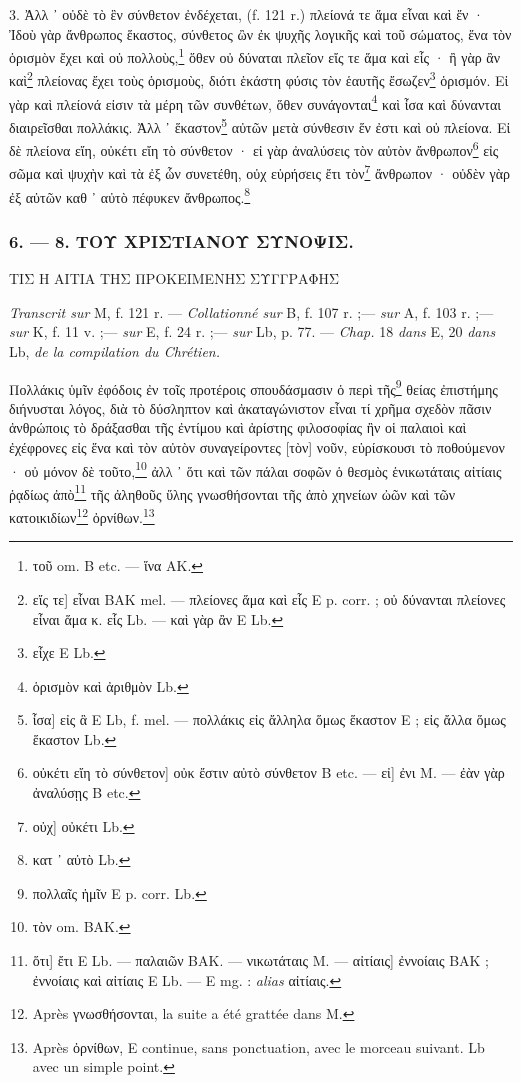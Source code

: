 \documentclass[a4paper, 11pt, oneside, polutonikogreek, french]{article}
\begin{document}
3. Ἀλλ ᾽ οὐδὲ τὸ ἓν σύνθετον ἐνδέχεται, (f. 121 r.) πλείονά τε ἅμα εἶναι καὶ ἕν · Ἰδοὺ γὰρ ἄνθρωπος ἕκαστος, σύνθετος ὢν ἐκ ψυχῆς λογικῆς καὶ τοῦ σώματος, ἕνα τὸν ὁρισμὸν ἔχει καὶ οὐ πολλοὺς,\footnote{τοῦ om. B etc. --- ἵνα AK.} ὅθεν οὐ δύναται πλεῖον εἴς τε ἅμα καὶ εἷς · ἢ γὰρ ἂν καὶ\footnote{εἴς τε] εἶναι BAK mel. --- πλείονες ἅμα καὶ εἷς E p. corr. ; οὐ δύνανται πλείονες εἶναι ἅμα κ. εἷς Lb. --- καὶ γὰρ ἂν E Lb.} πλείονας ἔχει τοὺς ὁρισμοὺς, διότι ἑκάστη φύσις τὸν ἑαυτῆς ἔσωζεν\footnote{εἶχε E Lb.} ὁρισμόν. Εἰ γὰρ καὶ πλείονά εἰσιν τὰ μέρη τῶν συνθέτων, ὅθεν συνάγονται\footnote{ὁρισμὸν καὶ ἀριθμὸν Lb.} καὶ ἶσα καὶ δύνανται διαιρεῖσθαι πολλάκις. Ἀλλ ᾽ ἕκαστον\footnote{ἶσα] εἰς ἃ E Lb, f. mel. --- πολλάκις εἰς ἄλληλα ὅμως ἕκαστον E ; εἰς ἄλλα ὅμως ἕκαστον Lb.} αὐτῶν μετὰ σύνθεσιν ἕν ἐστι καὶ οὐ πλείονα. Εἰ δὲ πλείονα εἴη, οὐκέτι εἴη τὸ σύνθετον · εἰ γὰρ ἀναλύσεις τὸν αὐτὸν ἄνθρωπον\footnote{οὐκέτι εἴη τὸ σύνθετον] οὐκ ἔστιν αὐτὸ σύνθετον B etc. --- εἰ] ἐνι M. --- ἐὰν γὰρ ἀναλύσῃς B etc.} εἰς σῶμα καὶ ψυχὴν καὶ τὰ ἐξ ὧν συνετέθη, οὐχ εὑρήσεις ἔτι τὸν\footnote{οὐχ] οὐκέτι Lb.} ἄνθρωπον · οὐδὲν γὰρ ἐξ αὐτῶν καθ ᾽ αὐτὸ πέφυκεν ἄνθρωπος.\footnote{κατ ᾽ αὐτὸ Lb.}

\bigskip
\centerline{\EightStarTaper}
\centerline{\EightStarTaper\EightStarTaper}
\bigskip

\subsubsection{6. --- 8. ΤΟΥ ΧΡΙΣΤΙΑΝΟΥ ΣΥΝΟΨΙΣ.}

ΤΙΣ Η ΑΙΤΙΑ ΤΗΣ ΠΡΟΚΕΙΜΕΝΗΣ ΣΥΓΓΡΑΦΗΣ

\emph{Transcrit sur} M, f. 121 r. --- \emph{Collationné sur} B, f. 107 r. ;--- \emph{sur} A, f. 103 r. ;--- \emph{sur} K, f. 11 v. ;--- \emph{sur} E, f. 24 r. ;--- \emph{sur} Lb, p. 77. --- \emph{Chap.} 18 \emph{dans} E, 20 \emph{dans} Lb, \emph{de la compilation du Chrétien.}

\bigskip

Πολλάκις ὑμῖν ἐφόδοις ἐν τοῖς προτέροις σπουδάσμασιν ὁ περὶ τῆς\footnote{πολλαῖς ἡμῖν E p. corr. Lb.} θείας ἐπιστήμης διήνυσται λόγος, διὰ τὸ δύσληπτον καὶ ἀκαταγώνιστον εἶναι τί χρῆμα σχεδὸν πᾶσιν ἀνθρώποις τὸ δράξασθαι τῆς ἐντίμου καὶ ἀρίστης φιλοσοφίας ἢν οἱ παλαιοὶ καὶ ἐχέφρονες εἰς ἕνα καὶ τὸν αὐτὸν συναγείροντες [τὸν] νοῦν, εὑρίσκουσι τὸ ποθούμενον · οὐ μόνον δὲ τοῦτο,\footnote{τὸν om. BAK.} ἀλλ ᾽ ὅτι καὶ τῶν πάλαι σοφῶν ὁ θεσμὸς ἑνικωτάταις αἰτίαις ῥᾳδίως ἀπὸ\footnote{ὅτι] ἔτι E Lb. --- παλαιῶν BAK. --- νικωτάταις M. --- αἰτίαις] ἐννοίαις BAK ; ἐννοίαις καὶ αἰτίαις E Lb. --- E mg. : \emph{alias} αἰτίαις.} τῆς ἀληθοῦς ὕλης γνωσθήσονται τῆς ἀπὸ χηνείων ὠῶν καὶ τῶν κατοικιδίων\footnote{Après γνωσθήσονται, la suite a été grattée dans M.} ὀρνίθων.\footnote{Après ὀρνίθων, E continue, sans ponctuation, avec le morceau suivant. Lb avec un simple point.}
\end{document}
